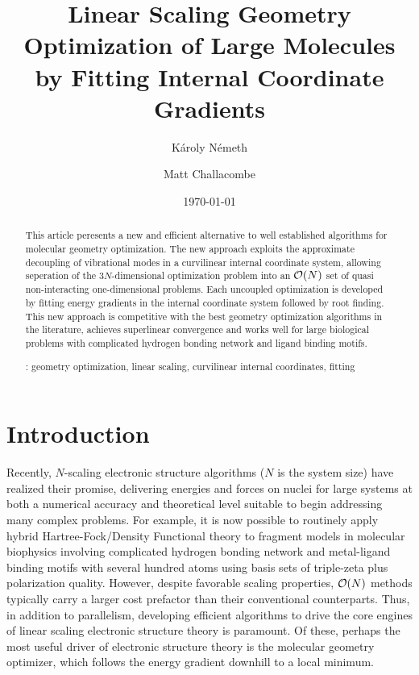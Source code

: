 \documentclass[prl,twocolumn,showpacs,twocolumngrid,superbib]{revtex4}
\begin{document}
\title{
Linear Scaling Geometry Optimization of Large Molecules by Fitting
Internal Coordinate Gradients \footnotemark[1]}

\author{K\'aroly N\'emeth\footnotemark[2]}
\author{Matt Challacombe}


\date{\today}

\begin{abstract}
{
This article peresents a new and efficient alternative to well established
algorithms for molecular geometry optimization.   The new approach 
exploits the approximate decoupling of vibrational modes in a curvilinear 
internal coordinate system,  allowing seperation  of the 3$N$-dimensional
optimization problem into an ${\cal{O}}(N)$ set of quasi non-interacting
one-dimensional problems.  Each  uncoupled optimization is developed by fitting 
energy gradients in the internal coordinate system followed by root finding.  
This new approach is competitive with the best  geometry optimization algorithms 
in the literature, achieves superlinear convergence and works well for large 
biological problems with complicated hydrogen bonding network 
and ligand binding motifs.  
}

\smallskip
{}: 
geometry optimization, linear scaling, 
curvilinear internal coordinates, fitting
\end{abstract}
 

\maketitle


\section{Introduction}

Recently, $N$-scaling electronic structure algorithms ($N$ is the system size)  have 
realized their promise, delivering energies and forces on nuclei for large systems at 
both a numerical accuracy and theoretical level suitable to begin addressing many complex 
problems.  For example, it is now possible to routinely apply hybrid Hartree-Fock/Density 
Functional theory to fragment models in molecular biophysics involving complicated 
hydrogen bonding network and metal-ligand binding motifs 
with several hundred atoms using basis sets of triple-zeta plus 
polarization quality.  However, despite favorable scaling properties, ${\cal O}(N)$ 
methods typically carry a larger cost prefactor than their conventional counterparts.  Thus, 
in addition to parallelism, developing efficient algorithms to drive the core engines of 
linear scaling electronic structure theory is paramount.  Of these, perhaps the most useful 
driver of electronic structure theory is the molecular geometry optimizer, which follows 
the energy gradient downhill to a local minimum.   
\end{document}
